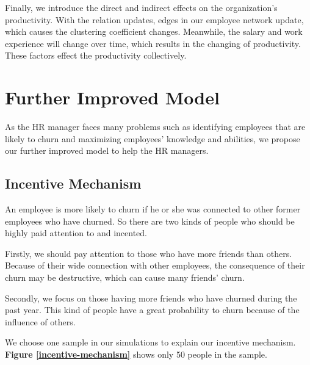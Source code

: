 \documentclass[12pt,a4paper,titlepage]{article}
\begin{document}
Finally, we introduce the direct and indirect effects on the
organization's productivity. With the relation updates, edges in our
employee network update, which causes the clustering coefficient
changes. Meanwhile, the salary and work experience will change over
time, which results in the changing of productivity. These factors
effect the productivity collectively.

\section{Further Improved Model}

As the HR manager faces many problems such as identifying employees that
are likely to churn and maximizing employees' knowledge and
abilities, we propose our further improved model to help the HR managers.

\subsection{Incentive Mechanism}
\label{sec:incentive-machanism}

An employee is more likely to churn if he or she was connected to other
former employees who have churned. So there are two kinds of people
who should be highly paid attention to and incented.

Firstly, we should pay attention to those who have more friends than
others. Because of their wide connection with other employees, the
consequence of their churn may be destructive, which can cause many
friends' churn.

Secondly, we focus on those having more friends who have churned
during the past year. This kind of people have a great probability to
churn because of the influence of others.

We choose one sample in our simulations to explain our incentive
mechanism. \textbf{Figure \ref{incentive-mechanism}} shows only 50
people in the sample.
\end{document}
